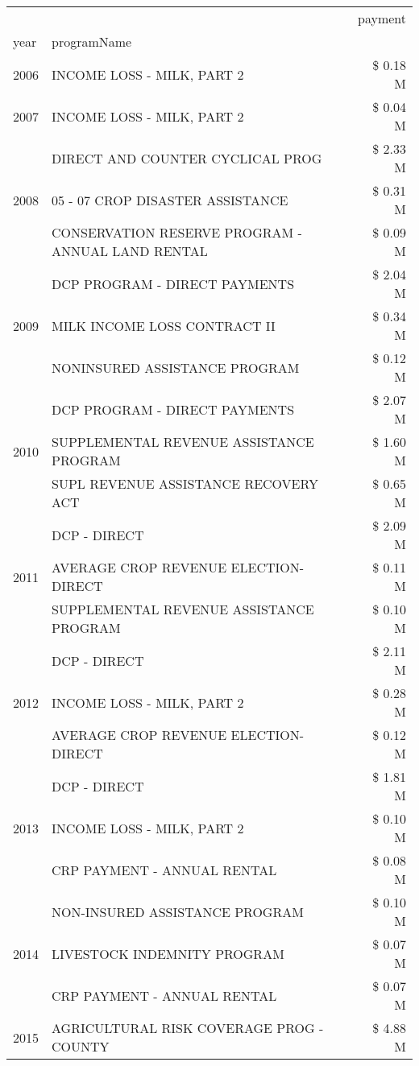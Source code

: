 \begin{tabular}{llr}
\toprule
 &  & payment \\
year & programName &  \\
\midrule
2006 & INCOME LOSS - MILK, PART 2 & \$ 0.18 M \\
\cline{1-3}
2007 & INCOME LOSS - MILK, PART 2 & \$ 0.04 M \\
\cline{1-3}
\multirow[t]{3}{*}{2008} & DIRECT AND COUNTER CYCLICAL PROG & \$ 2.33 M \\
 & 05 - 07 CROP DISASTER ASSISTANCE & \$ 0.31 M \\
 & CONSERVATION RESERVE PROGRAM - ANNUAL LAND RENTAL & \$ 0.09 M \\
\cline{1-3}
\multirow[t]{3}{*}{2009} & DCP PROGRAM - DIRECT PAYMENTS & \$ 2.04 M \\
 & MILK INCOME LOSS CONTRACT II & \$ 0.34 M \\
 & NONINSURED ASSISTANCE PROGRAM & \$ 0.12 M \\
\cline{1-3}
\multirow[t]{3}{*}{2010} & DCP PROGRAM - DIRECT PAYMENTS & \$ 2.07 M \\
 & SUPPLEMENTAL REVENUE ASSISTANCE PROGRAM & \$ 1.60 M \\
 & SUPL REVENUE ASSISTANCE RECOVERY ACT & \$ 0.65 M \\
\cline{1-3}
\multirow[t]{3}{*}{2011} & DCP - DIRECT & \$ 2.09 M \\
 & AVERAGE CROP REVENUE ELECTION-DIRECT & \$ 0.11 M \\
 & SUPPLEMENTAL REVENUE ASSISTANCE PROGRAM & \$ 0.10 M \\
\cline{1-3}
\multirow[t]{3}{*}{2012} & DCP - DIRECT & \$ 2.11 M \\
 & INCOME LOSS - MILK, PART 2 & \$ 0.28 M \\
 & AVERAGE CROP REVENUE ELECTION-DIRECT & \$ 0.12 M \\
\cline{1-3}
\multirow[t]{3}{*}{2013} & DCP - DIRECT & \$ 1.81 M \\
 & INCOME LOSS - MILK, PART 2 & \$ 0.10 M \\
 & CRP PAYMENT - ANNUAL RENTAL & \$ 0.08 M \\
\cline{1-3}
\multirow[t]{3}{*}{2014} & NON-INSURED ASSISTANCE PROGRAM & \$ 0.10 M \\
 & LIVESTOCK INDEMNITY PROGRAM & \$ 0.07 M \\
 & CRP PAYMENT - ANNUAL RENTAL & \$ 0.07 M \\
\cline{1-3}
\multirow[t]{3}{*}{2015} & AGRICULTURAL RISK COVERAGE PROG - COUNTY & \$ 4.88 M \\

\end{tabular}
